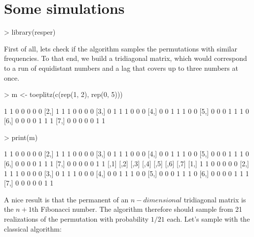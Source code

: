 \documentclass{scrartcl}
\begin{document}
\section{Some simulations}

\begin{Schunk}
\begin{Sinput}
> library(resper)
\end{Sinput}
\end{Schunk}

First of all, lets check if the algorithm samples the permutations
with similar frequencies. To that end, we build a tridiagonal matrix,
which would correspond to a run of equidistant numbers and a lag that
covers up to three numbers at once.

\begin{Schunk}
\begin{Sinput}
> m <- toeplitz(c(rep(1, 2), rep(0, 5)))
\end{Sinput}
\begin{Soutput}
     [,1] [,2] [,3] [,4] [,5] [,6] [,7]
[1,]    1    1    0    0    0    0    0
[2,]    1    1    1    0    0    0    0
[3,]    0    1    1    1    0    0    0
[4,]    0    0    1    1    1    0    0
[5,]    0    0    0    1    1    1    0
[6,]    0    0    0    0    1    1    1
[7,]    0    0    0    0    0    1    1
\end{Soutput}
\begin{Sinput}
> print(m)
\end{Sinput}
\begin{Soutput}
     [,1] [,2] [,3] [,4] [,5] [,6] [,7]
[1,]    1    1    0    0    0    0    0
[2,]    1    1    1    0    0    0    0
[3,]    0    1    1    1    0    0    0
[4,]    0    0    1    1    1    0    0
[5,]    0    0    0    1    1    1    0
[6,]    0    0    0    0    1    1    1
[7,]    0    0    0    0    0    1    1
     [,1] [,2] [,3] [,4] [,5] [,6] [,7]
[1,]    1    1    0    0    0    0    0
[2,]    1    1    1    0    0    0    0
[3,]    0    1    1    1    0    0    0
[4,]    0    0    1    1    1    0    0
[5,]    0    0    0    1    1    1    0
[6,]    0    0    0    0    1    1    1
[7,]    0    0    0    0    0    1    1
\end{Soutput}
\end{Schunk}

A nice result is that the permanent of an $n-dimensional$ tridiagonal
matrix is the $n+1$th Fibonacci number. The algorithm therefore should sample from 21 realizations of the permutation with probability $1/21$ each. Let's sample with the classical algorithm:
\end{document}
